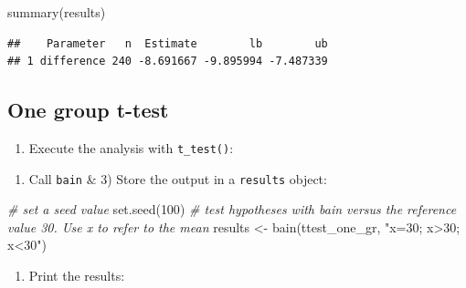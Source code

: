 \documentclass[
]{book}
\newenvironment{Shaded}{\begin{snugshade}}{\end{snugshade}}
\newcommand{\CommentTok}[1]{\textcolor[rgb]{0.56,0.35,0.01}{\textit{#1}}}
\newcommand{\DecValTok}[1]{\textcolor[rgb]{0.00,0.00,0.81}{#1}}
\newcommand{\FunctionTok}[1]{\textcolor[rgb]{0.00,0.00,0.00}{#1}}
\newcommand{\NormalTok}[1]{#1}
\newcommand{\OtherTok}[1]{\textcolor[rgb]{0.56,0.35,0.01}{#1}}
\newcommand{\SpecialCharTok}[1]{\textcolor[rgb]{0.00,0.00,0.00}{#1}}
\newcommand{\StringTok}[1]{\textcolor[rgb]{0.31,0.60,0.02}{#1}}
\providecommand{\tightlist}{%
  \setlength{\itemsep}{0pt}\setlength{\parskip}{0pt}}
\begin{document}
\begin{Shaded}
\begin{Highlighting}[]
\FunctionTok{summary}\NormalTok{(results)}
\end{Highlighting}
\end{Shaded}

\begin{verbatim}
##    Parameter   n  Estimate        lb        ub
## 1 difference 240 -8.691667 -9.895994 -7.487339
\end{verbatim}

\hypertarget{one-group-t-test}{%
\subsection{One group t-test}\label{one-group-t-test}}

\begin{enumerate}
\def\labelenumi{\arabic{enumi})}
\tightlist
\item
  Execute the analysis with \texttt{t\_test()}:
\end{enumerate}

\begin{Shaded}
\end{Shaded}

\begin{enumerate}
\def\labelenumi{\arabic{enumi})}
\setcounter{enumi}{1}
\tightlist
\item
  Call \texttt{bain} \& 3) Store the output in a \texttt{results} object:
\end{enumerate}

\begin{Shaded}
\begin{Highlighting}[]
\CommentTok{\# set a seed value}
\FunctionTok{set.seed}\NormalTok{(}\DecValTok{100}\NormalTok{)}
\CommentTok{\# test hypotheses with bain versus the reference value 30. Use x to refer to the mean}
\NormalTok{results }\OtherTok{\textless{}{-}} \FunctionTok{bain}\NormalTok{(ttest\_one\_gr, }\StringTok{"x=30; x\textgreater{}30; x\textless{}30"}\NormalTok{)}
\end{Highlighting}
\end{Shaded}

\begin{enumerate}
\def\labelenumi{\arabic{enumi})}
\setcounter{enumi}{2}
\tightlist
\item
  Print the results:
\end{enumerate}
\end{document}
